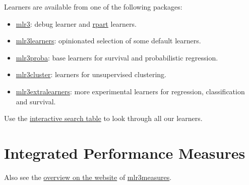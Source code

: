\documentclass[
]{scrbook}
\providecommand{\tightlist}{%
  \setlength{\itemsep}{0pt}\setlength{\parskip}{0pt}}
\begin{document}
Learners are available from one of the following packages:

\begin{itemize}
\tightlist
\item
  \href{https://mlr3.mlr-org.com}{mlr3}: debug learner and \href{https://cran.r-project.org/package=rpart}{rpart} learners.
\item
  \href{https://mlr3learners.mlr-org.com}{mlr3learners}: opinionated selection of some default learners.
\item
  \href{https://mlr3proba.mlr-org.com}{mlr3proba}: base learners for survival and probabilistic regression.
\item
  \href{https://mlr3cluster.mlr-org.com}{mlr3cluster}: learners for unsupervised clustering.
\item
  \href{https://mlr3extralearners.mlr-org.com}{mlr3extralearners}: more experimental learners for regression, classification and survival.
\end{itemize}

Use the \href{https://mlr3extralearners.mlr-org.com/articles/learners/list_learners.html}{interactive search table} to look through all our learners.

\hypertarget{list-measures}{%
\section{Integrated Performance Measures}\label{list-measures}}

Also see the \href{https://mlr3measures.mlr-org.com/reference/}{overview on the website} of \href{https://cran.r-project.org/package=mlr3measures}{mlr3measures}.
\end{document}
